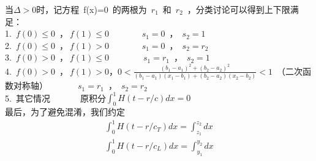     当$\Delta >0$时，记方程~f(x)=0~的两根为~$r_1$~和~$r_2$~，分类讨论可以得到上下限满足：\\
    1.~$f(0) \le 0 $~，$~f(1)  \le 0$     ~~~~~~~$s_{1} =0$~，~$s_{2} = 1$\\
    2.~$f(0) \le 0 $~，$~f(1)  > 0$     ~~~~~~~$s_{1} =0$~，~$s_{2} = r_{2}$ \\
    3.~$f(0) > 0 $~，$~f(1)  \le 0$~~~~~~~~$s_{1} =r_{1}$~，~$s_{2} = 1$\\
    4.~$f(0) > 0 $~，$~f(1)  > 0$，$0<\displaystyle\frac{(b_{1}-a_{1})^{2} + (b_{2}-a_{2})^{2}}{(b_1 - a_1)(x_1 -b_1)+(b_2-a_2)(x_2-b_2)}<1$~（二次函数对称轴）~~~~~~~$s_{1} =r_{1}$~，~$s_{2} = r_{2}$\\
    5.~其它情况~~~~~~~原积分$  \int_{0}^{1}H(t-r/c)dx = 0$\\
    最后，为了避免混淆，我们约定
    \begin{align} 
         \int_{0}^{1}H(t-r/c_T)dx=\int_{z_{1}}^{z_{2}} dx \label{con:def-sxxian1}\\
          \int_{0}^{1}H(t-r/c_L)dx=\int_{y_{1}}^{y_{2}} dx \label{con:def-sxxian2}
    \end{align} 
    
